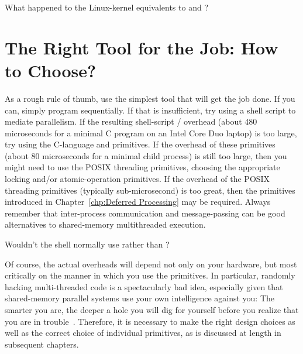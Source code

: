 \QuickQuiz{}
	What happened to the Linux-kernel equivalents to 
	and ?
 \QuickQuizEnd

\section{The Right Tool for the Job: How to Choose?}
\label{sec:toolsoftrade:The Right Tool for the Job: How to Choose?}

As a rough rule of thumb, use the simplest tool that will get the job done.
If you can, simply program sequentially.
If that is insufficient, try using a shell script to mediate parallelism.
If the resulting shell-script / overhead
(about 480 microseconds for a minimal C program on an Intel Core Duo
laptop) is too
large, try using the C-language  and  primitives.
If the overhead of these primitives (about 80 microseconds for a minimal
child process) is still too large, then you
might need to use the POSIX threading primitives, choosing the appropriate
locking and/or atomic-operation primitives.
If the overhead of the POSIX threading primitives (typically sub-microsecond)
is too great, then the primitives introduced in
Chapter~\ref{chp:Deferred Processing} may be required.
Always remember that inter-process communication and message-passing
can be good alternatives to shared-memory multithreaded execution.

\QuickQuiz{}
	Wouldn't the shell normally use  rather than
	?
 \QuickQuizEnd

Of course, the actual overheads will depend not only on your hardware,
but most critically on the manner in which you use the primitives.
In particular, randomly hacking multi-threaded code is a spectacularly
bad idea, especially given that shared-memory parallel systems use
your own intelligence against you:
The smarter you are, the deeper a hole you will dig for yourself before
you realize that you are in trouble~\cite{DeadlockEmpire2016}.
Therefore, it is necessary to make the right design choices as well as
the correct choice of individual primitives,
as is discussed at length in subsequent chapters.
